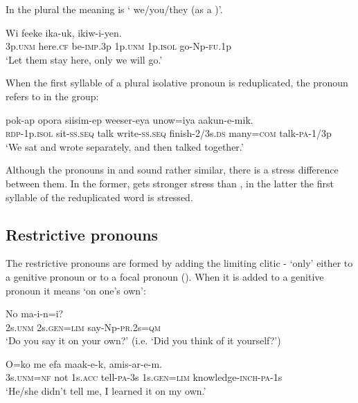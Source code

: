 In the plural the meaning is ` we/you/they (as a )'. 

\ea%
\label{ex:3:x602}
\gll Wi feeke ika-uk,   ikiw-i-yen. \\
3p.\textsc{unm} here.\textsc{cf} be-\textsc{imp}.3p 1p.\textsc{unm} 1p.\textsc{isol} go-Np-\textsc{fu}.1p\\
\glt`Let them stay here, only we will go.'
\z

When the first syllable of a plural isolative pronoun is reduplicated, the pronoun refers to  in the group:

\ea%
\label{ex:3:x603}
\gll {} pok-ap opora siisim-ep weeser-eya unow=iya aakun-e-mik.\\
\textsc{rdp}-1p.\textsc{isol} sit-\textsc{ss}.\textsc{seq} talk write-\textsc{ss}.\textsc{seq} finish-2/3s.\textsc{ds} many=\textsc{com} talk-\textsc{pa}-1/3p\\
\glt`We sat and wrote separately, and then talked together.'
\z

Although the pronouns in  and  sound rather similar, there is a stress difference between them. In the former,  gets stronger stress than , in the latter the first syllable of the reduplicated word is stressed.

\subsection{Restrictive pronouns}\label{sec:3.5.7}
{}
The restrictive pronouns are formed by adding the limiting clitic - `only' either to a genitive pronoun or to a focal pronoun (). When it is added to a genitive pronoun it means `on one's own':

\ea%
\label{ex:3:x605}
\gll No  ma-i-n=i? \\
2s.\textsc{unm} 2s.\textsc{gen}=\textsc{lim} say-Np-\textsc{pr}.2s=\textsc{qm}\\
\glt`Do you say it on your own?' (i.e. `Did you think of it yourself?')
\z

\ea%
\label{ex:3:x606}
\gll O=ko me efa maak-e-k,  amis-ar-e-m.\\
3s.\textsc{unm}=\textsc{nf} not 1s.\textsc{acc} tell-\textsc{pa}-3s 1s.\textsc{gen}=\textsc{lim} knowledge-\textsc{inch}-\textsc{pa}-1s\\
\glt`He/she didn't tell me, I learned it on my own.'
\z

